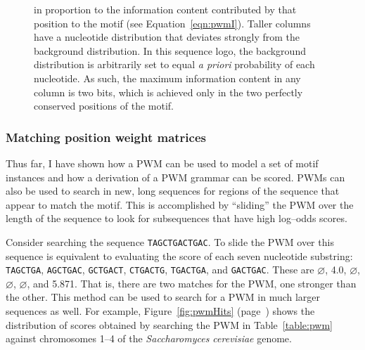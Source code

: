 \begin{figure}[ptb]
{            in proportion to the information content contributed by
            that position to the motif (see
            Equation~\vref{eqn:pwmI}).  Taller columns have a
            nucleotide distribution that deviates strongly from the
            background distribution.  In this sequence logo, the
            background distribution is arbitrarily set to equal
            \emph{a priori} probability of each nucleotide.  As
            such, the maximum information content in any column is
            two bits, which is achieved only in the two perfectly
            conserved positions of the motif.
            }
            \label{fig:yeastLogo}
            \end{figure}

\subsubsection*{Matching position weight matrices}

        Thus far, I have shown how a PWM can be used to model a
        set of motif instances and how a derivation of a PWM
        grammar can be scored.  PWMs can also be used to search in
        new, long sequences for regions of the sequence that appear
        to match the motif.  This is accomplished by ``sliding'' the
        PWM over the length of the sequence to look for subsequences
        that have high log--odds scores.

        Consider searching the sequence \texttt{TAGCTGACTGAC}.  To
        slide the PWM over this sequence is equivalent to evaluating
        the score of each seven nucleotide substring:
        \texttt{TAGCTGA},
        \texttt{AGCTGAC},
        \texttt{GCTGACT},
        \texttt{CTGACTG},
        \texttt{TGACTGA}, and
        \texttt{GACTGAC}.  These are $\varnothing$, 4.0,
         $\varnothing$, $\varnothing$, $\varnothing$, and
         5.871.  That is, there are two matches for the PWM, one
         stronger than the other.  This method can be used to search
         for a PWM in much larger sequences as well.  For example,
         Figure~\ref{fig:pwmHits} (page~\pageref{fig:pwmHits}) shows the distribution of scores
         obtained by searching
            the PWM in Table~\vref{table:pwm} against chromosomes 1--4 of
        the
            \emph{Saccharomyces cerevisiae} genome.


